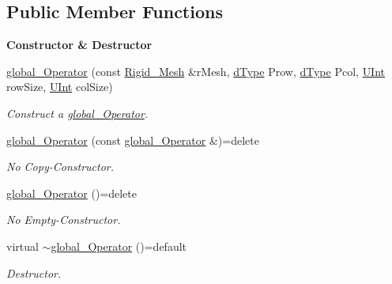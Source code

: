 \subsection*{Public Member Functions}
\begin{Indent}{\bf Constructor \& Destructor}\par
\begin{DoxyCompactItemize}
\item 
\hyperlink{classFVCode3D_1_1global__Operator_a34d96be91b91e05cec5a53ce6364964f}{global\+\_\+\+Operator} (const \hyperlink{classFVCode3D_1_1Rigid__Mesh}{Rigid\+\_\+\+Mesh} \&r\+Mesh, \hyperlink{classFVCode3D_1_1global__Operator_a9e94fbe56b84ba80f9e9be56c808e5c3}{d\+Type} Prow, \hyperlink{classFVCode3D_1_1global__Operator_a9e94fbe56b84ba80f9e9be56c808e5c3}{d\+Type} Pcol, \hyperlink{namespaceFVCode3D_a4bf7e328c75d0fd504050d040ebe9eda}{U\+Int} row\+Size, \hyperlink{namespaceFVCode3D_a4bf7e328c75d0fd504050d040ebe9eda}{U\+Int} col\+Size)
\begin{DoxyCompactList}\small\item\em Construct a \hyperlink{classFVCode3D_1_1global__Operator}{global\+\_\+\+Operator}. \end{DoxyCompactList}\item 
\hyperlink{classFVCode3D_1_1global__Operator_a4bea1189138f11fb6a5ddf0f696bd11a}{global\+\_\+\+Operator} (const \hyperlink{classFVCode3D_1_1global__Operator}{global\+\_\+\+Operator} \&)=delete
\begin{DoxyCompactList}\small\item\em No Copy-\/\+Constructor. \end{DoxyCompactList}\item 
\hyperlink{classFVCode3D_1_1global__Operator_ab9b0c182cdf6026e3e4e2e5e832b861a}{global\+\_\+\+Operator} ()=delete
\begin{DoxyCompactList}\small\item\em No Empty-\/\+Constructor. \end{DoxyCompactList}\item 
virtual \hyperlink{classFVCode3D_1_1global__Operator_af08e8ff43fa00eb9a25f28231e419a6e}{$\sim$global\+\_\+\+Operator} ()=default
\begin{DoxyCompactList}\small\item\em Destructor. \end{DoxyCompactList}\end{DoxyCompactItemize}
\end{Indent}
